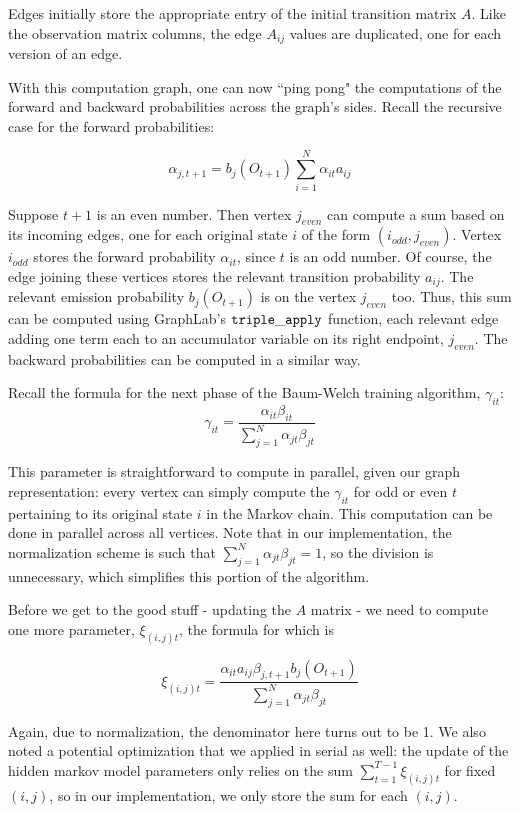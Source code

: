 Edges initially store the appropriate entry of the initial transition matrix $A$.  Like the observation matrix columns, the edge $A_{ij}$ values are duplicated, one for each version of an edge.

With this computation graph, one can now ``ping pong" the computations of the forward and backward probabilities across the graph's sides.  Recall the recursive case for the forward probabilities:

$$\alpha_{j, t+1} = b_j(O_{t + 1})\sum_{i = 1}^N \alpha_{it} a_{ij} $$

Suppose $t+1$ is an even number.  Then vertex $j_{even}$ can compute a sum based on its incoming edges, one for each original state $i$ of the form $(i_{odd}, j_{even})$.  Vertex $i_{odd}$ stores the forward probability $\alpha_{i t}$, since $t$ is an odd number.  Of course, the edge joining these vertices stores the relevant transition probability $a_{ij}$.  The relevant emission probability $b_j(O_{t + 1})$ is on the vertex $j_{even}$ too.  Thus, this sum can be computed using GraphLab's $\tt{triple\_apply}$ function, each relevant edge adding one term each to an accumulator variable on its right endpoint, $j_{even}$.  The backward probabilities can be computed in a similar way.

Recall the formula for the next phase of the Baum-Welch training algorithm, $\gamma_{it}$: 
$$\gamma_{it} = \frac{\alpha_{it}\beta_{it}}{\sum_{j = 1}^N \alpha_{jt}\beta_{jt}} $$

This parameter is straightforward to compute in parallel, given our graph representation: every vertex can simply compute the $\gamma_{it}$ for odd or even $t$ pertaining to its original state $i$ in the Markov chain.  This computation can be done in parallel across all vertices.   Note that in our implementation, the normalization scheme is such that $\sum_{j = 1}^N \alpha_{jt}\beta_{jt} = 1$, so the division is unnecessary, which simplifies this portion of the algorithm.

Before we get to the good stuff - updating the $A$ matrix - we need to compute one more parameter, $\xi_{(i,j)t}$, the formula for which is

$$\xi_{(i,j)t} = \frac{\alpha_{it}a_{ij}\beta_{j, t+1} b_j(O_{t+1})}{\sum_{j = 1}^N \alpha_{jt}\beta_{jt}}$$

Again, due to normalization, the denominator here turns out to be 1.  We also noted a potential optimization that we applied in serial as well: the update of the hidden markov model parameters only relies on the sum $\sum_{t = 1}^{T-1} \xi_{(i,j)t} $ for fixed $(i, j)$, so in our implementation, we only store the sum for each $(i, j)$.

